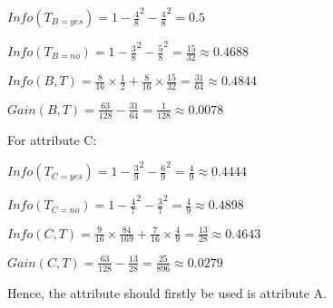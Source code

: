 $Info(T_{B=yes}) = 1 - \frac{4}{8}^2 - \frac{4}{8}^2 = 0.5$

$Info(T_{B=no}) = 1 - \frac{3}{8}^2- \frac{5}{8}^2 = \frac{15}{32} \approx 0.4688$

$Info(B, T) = \frac{8}{16} \times \frac{1}{2} + \frac{8}{16} \times \frac{15}{32} = \frac{31}{64} \approx 0.4844$

$Gain(B, T) = \frac{63}{128} - \frac{31}{64} = \frac{1}{128} \approx 0.0078$

For attribute C:

$Info(T_{C=yes}) = 1 - \frac{3}{9}^2 - \frac{6}{9}^2 = \frac{4}{9} \approx 0.4444$

$Info(T_{C=no}) = 1 - \frac{4}{7}^2- \frac{3}{7}^2 = \frac{4}{9} \approx 0.4898$

$Info(C, T) = \frac{9}{16} \times \frac{84}{169} + \frac{7}{16} \times \frac{4}{9} = \frac{13}{28} \approx 0.4643$

$Gain(C, T) = \frac{63}{128} - \frac{13}{28} = \frac{25}{896} \approx 0.0279$

Hence, the attribute should firstly be used is attribute A.
